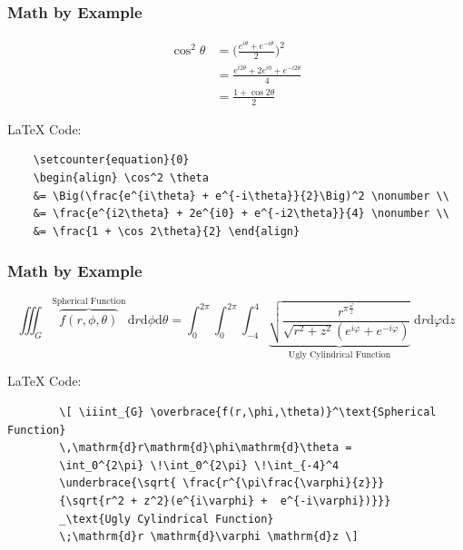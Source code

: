 \documentclass{beamer}
\begin{document}
\begin{frame}[containsverbatim]
    \frametitle{Math by Example}
    \setcounter{equation}{0}
    \begin{align} \cos^2 \theta &= \Big(\frac{e^{i\theta} + e^{-i\theta}}{2}\Big)^2 \nonumber \\ 
    &= \frac{e^{i2\theta} + 2e^{i0} + e^{-i2\theta}}{4} \nonumber \\
    &= \frac{1 + \cos 2\theta}{2} \end{align}
    
    \vspace{-10pt}

    \begin{block}{\LaTeX{ }Code:}
    \small{
    \begin{verbatim}
    \setcounter{equation}{0}
    \begin{align} \cos^2 \theta 
    &= \Big(\frac{e^{i\theta} + e^{-i\theta}}{2}\Big)^2 \nonumber \\ 
    &= \frac{e^{i2\theta} + 2e^{i0} + e^{-i2\theta}}{4} \nonumber \\
    &= \frac{1 + \cos 2\theta}{2} \end{align}
    \end{verbatim}}
    \end{block}

\end{frame}

\begin{frame}[containsverbatim]
    \frametitle{Math by Example}
    
    \[ \iiint_{G} \overbrace{f(r,\phi,\theta)}^\text{Spherical Function} \,\mathrm{d}r\mathrm{d}\phi\mathrm{d}\theta = \int_0^{2\pi}\!\int_0^{2\pi}\!\int_{-4}^4 \underbrace{\sqrt{\frac{r^{\pi\frac{\varphi}{z}}}{\sqrt{r^2 + z^2}(e^{i\varphi} +  e^{-i\varphi})}}}_\text{Ugly Cylindrical Function}  \;\mathrm{d}r\mathrm{d}\varphi\mathrm{d}z\]

    \begin{block}{\LaTeX{ }Code:}
    \footnotesize{
    \begin{verbatim}
        \[ \iiint_{G} \overbrace{f(r,\phi,\theta)}^\text{Spherical Function}
        \,\mathrm{d}r\mathrm{d}\phi\mathrm{d}\theta = 
        \int_0^{2\pi} \!\int_0^{2\pi} \!\int_{-4}^4
        \underbrace{\sqrt{ \frac{r^{\pi\frac{\varphi}{z}}}
        {\sqrt{r^2 + z^2}(e^{i\varphi} +  e^{-i\varphi})}}}
        _\text{Ugly Cylindrical Function}  
        \;\mathrm{d}r \mathrm{d}\varphi \mathrm{d}z \]
    \end{verbatim}
    }
    \end{block}
\end{frame}
\end{document}
